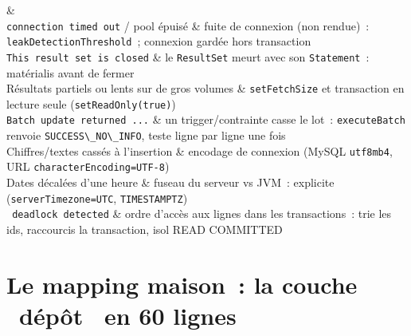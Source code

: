\begin{tablez}[p{0.2\textwidth}X]
  \headrow {} \&  \\
  \midrule
  \verb|connection timed out| / pool \'epuis\'e \& fuite de connexion (non rendue)~: \verb|leakDetectionThreshold|~; connexion gard\'ee hors transaction \\
  \verb|This result set is closed| \& le \verb|ResultSet| meurt avec son \verb|Statement|~: mat\'erialis avant de fermer \\
  R\'esultats partiels ou lents sur de gros volumes \& \verb|setFetchSize| et transaction en lecture seule (\verb|setReadOnly(true)|) \\
  \verb|Batch update returned ...| \& un trigger/contrainte casse le lot~: \verb|executeBatch| renvoie \verb|SUCCESS\_NO\_INFO|, teste ligne par ligne une fois \\
  Chiffres/textes cass\'es \`a l'insertion \& encodage de connexion (MySQL \verb|utf8mb4|, URL \verb|characterEncoding=UTF-8|) \\
  Dates d\'ecal\'ees d'une heure \& fuseau du serveur vs JVM~: explicite (\verb|serverTimezone=UTC|, \verb|TIMESTAMPTZ|) \\
  \verb| deadlock detected| \& ordre d'acc\`es aux lignes dans les transactions~: trie les ids, raccourcis la transaction, isol READ COMMITTED \\
\end{tablez}

\section{Le mapping maison~: la couche \og ~d\'ep\^ot~ \fg{} en 60 lignes}

